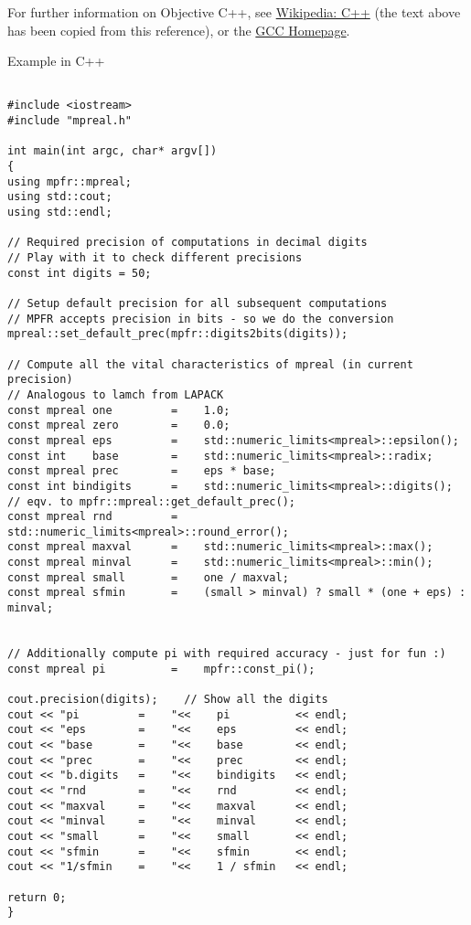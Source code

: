 \vpara
For further information on Objective C++, see \href{http://en.wikipedia.org/wiki/C\%2B\%2B}{Wikipedia: C++} (the text above has been copied from this reference), or the  \href{http://gcc.gnu.org/}{GCC Homepage}.


\vpara
Example in C++


\begin{lstlisting}

#include <iostream>
#include "mpreal.h"

int main(int argc, char* argv[])
{
using mpfr::mpreal;    
using std::cout;
using std::endl;

// Required precision of computations in decimal digits
// Play with it to check different precisions
const int digits = 50; 

// Setup default precision for all subsequent computations
// MPFR accepts precision in bits - so we do the conversion 
mpreal::set_default_prec(mpfr::digits2bits(digits));

// Compute all the vital characteristics of mpreal (in current precision)
// Analogous to lamch from LAPACK
const mpreal one         =    1.0;
const mpreal zero        =    0.0;
const mpreal eps         =    std::numeric_limits<mpreal>::epsilon();
const int    base        =    std::numeric_limits<mpreal>::radix;
const mpreal prec        =    eps * base;
const int bindigits      =    std::numeric_limits<mpreal>::digits(); // eqv. to mpfr::mpreal::get_default_prec();
const mpreal rnd         =    std::numeric_limits<mpreal>::round_error();
const mpreal maxval      =    std::numeric_limits<mpreal>::max();
const mpreal minval      =    std::numeric_limits<mpreal>::min();
const mpreal small       =    one / maxval;
const mpreal sfmin       =    (small > minval) ? small * (one + eps) : minval;


// Additionally compute pi with required accuracy - just for fun :)
const mpreal pi          =    mpfr::const_pi();

cout.precision(digits);    // Show all the digits
cout << "pi         =    "<<    pi          << endl;    
cout << "eps        =    "<<    eps         << endl;
cout << "base       =    "<<    base        << endl;
cout << "prec       =    "<<    prec        << endl;
cout << "b.digits   =    "<<    bindigits   << endl;
cout << "rnd        =    "<<    rnd         << endl;
cout << "maxval     =    "<<    maxval      << endl;    
cout << "minval     =    "<<    minval      << endl;    
cout << "small      =    "<<    small       << endl;    
cout << "sfmin      =    "<<    sfmin       << endl;    
cout << "1/sfmin    =    "<<    1 / sfmin   << endl;    

return 0;
}

\end{lstlisting}





